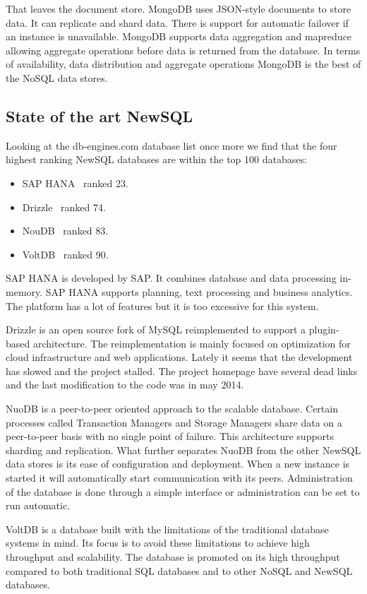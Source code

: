 That leaves the document store. MongoDB uses JSON-style documents to store data.
It can replicate and shard data. 
There is support for automatic failover if an instance is unavailable.
MongoDB supports data aggregation and mapreduce allowing aggregate operations before data is returned from the database.
In terms of availability, data distribution and aggregate operations MongoDB is the best of the NoSQL data stores.

\subsection{State of the art NewSQL}
Looking at the db-engines.com database list once more we find that the four highest ranking NewSQL databases are within the top 100 databases:

\begin{itemize}
\item SAP HANA~\cite{saphana} ranked 23.
\item Drizzle~\cite{drizzle} ranked 74.
\item NouDB~\cite{nuodb} ranked 83.
\item VoltDB~\cite{voltdb} ranked 90.
\end{itemize}

SAP HANA is developed by SAP.
It combines database and data processing in-memory.
SAP HANA supports planning, text processing and business analytics.
The platform has a lot of features but it is too excessive for this system.

Drizzle is an open source fork of MySQL reimplemented to support a plugin-based architecture.
The reimplementation is mainly focused on optimization for cloud infrastructure and web applications.
Lately it seems that the development has slowed and the project stalled.
The project homepage have several dead links and the last modification to the code was in may 2014.

NuoDB is a peer-to-peer oriented approach to the scalable database. Certain processes called Transaction Managers and Storage Managers share data on a peer-to-peer basis with no single point of failure.
This architecture supports sharding and replication.
What further separates NuoDB from the other NewSQL data stores is its ease of configuration and deployment. When a new instance is started it will automatically start communication with its peers. Administration of the database is done through a simple interface or administration can be set to run automatic.

VoltDB is a database built with the limitations of the traditional database systems in mind. Its focus is to avoid these limitations to achieve high throughput and scalability. The database is promoted on its high throughput compared to both traditional SQL databases and to other NoSQL and NewSQL databases.

